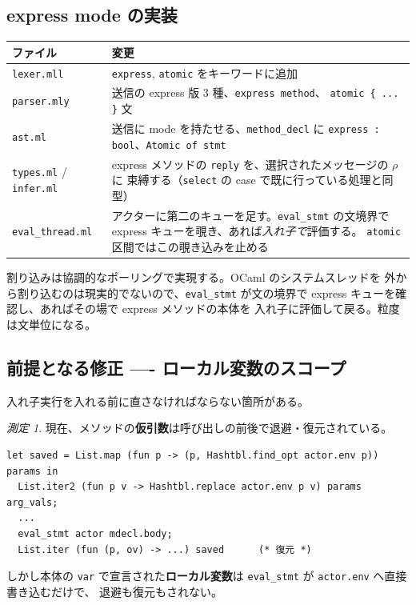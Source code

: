 \documentclass[11pt,a4paper]{ltjsarticle}
\theoremstyle{remark}
\newtheorem{finding}{測定}
\begin{document}
\subsection{express mode の実装}

\begin{center}
\small
\begin{tabular}{@{}lp{9.4cm}@{}}
\toprule
ファイル & 変更 \\
\midrule
\texttt{lexer.mll}   & \texttt{express}, \texttt{atomic} をキーワードに追加 \\
\texttt{parser.mly}  & 送信の express 版 3 種、\texttt{express method}、
  \texttt{atomic \{ ... \}} 文 \\
\texttt{ast.ml}      & 送信に mode を持たせる、\texttt{method\_decl} に
  \texttt{express : bool}、\texttt{Atomic of stmt} \\
\texttt{types.ml} / \texttt{infer.ml} &
  express メソッドの \texttt{reply} を、選択されたメッセージの $\rho$ に
  束縛する（\texttt{select} の case で既に行っている処理と同型） \\
\texttt{eval\_thread.ml} &
  アクターに第二のキューを足す。\texttt{eval\_stmt} の文境界で
  express キューを覗き、あれば\emph{入れ子で}評価する。
  \texttt{atomic} 区間ではこの覗き込みを止める \\
\bottomrule
\end{tabular}
\end{center}

割り込みは協調的なポーリングで実現する。OCaml のシステムスレッドを
外から割り込むのは現実的でないので、\texttt{eval\_stmt} が文の境界で
express キューを確認し、あればその場で express メソッドの本体を
入れ子に評価して戻る。粒度は文単位になる。

\subsection{前提となる修正 ---- ローカル変数のスコープ}

入れ子実行を入れる前に直さなければならない箇所がある。

\begin{finding}
現在、メソッドの\textbf{仮引数}は呼び出しの前後で退避・復元されている。

\begin{lstlisting}
let saved = List.map (fun p -> (p, Hashtbl.find_opt actor.env p)) params in
  List.iter2 (fun p v -> Hashtbl.replace actor.env p v) params arg_vals;
  ...
  eval_stmt actor mdecl.body;
  List.iter (fun (p, ov) -> ...) saved      (* 復元 *)
\end{lstlisting}

しかし本体の \texttt{var} で宣言された\textbf{ローカル変数}は
\texttt{eval\_stmt} が \texttt{actor.env} へ直接書き込むだけで、
退避も復元もされない。
\end{finding}
\end{document}
